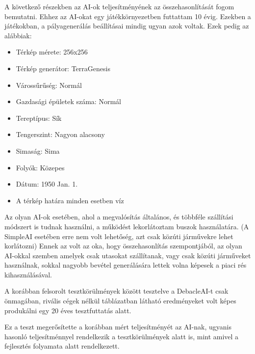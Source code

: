 
A következő részekben az AI-ok teljesítményének az összehasonlítását fogom bemutatni. Ehhez az AI-okat egy játékkörnyezetben futtattam 10 évig. Ezekben a játékokban, a pályagenerálás beállításai mindig ugyan azok voltak. Ezek pedig az alábbiak:

\begin{itemize}
	\item Térkép mérete: 256x256
	\item Térkép generátor: TerraGenesis
	\item Várossűrűség: Normál
	\item Gazdasági épületek száma: Normál
	\item Tereptípus: Sík
	\item Tengerszint: Nagyon alacsony
	\item Simaság: Sima
	\item Folyók: Közepes
	\item Dátum: 1950 Jan. 1.
	\item A térkép határa minden esetben víz
\end{itemize}

Az olyan AI-ok esetében, ahol a megvalósítás általános, és többféle szállítási módszert is tudnak használni, a működést lekorlátoztam buszok használatára. (A SimpleAI esetében erre nem volt lehetőség, azt csak közúti járművekre lehet korlátozni) Ennek az volt az oka, hogy összehasonlítás szempontjából, az olyan AI-okkal szemben amelyek csak utasokat szállítanak, vagy csak közúti járműveket használnak, sokkal nagyobb bevétel generálására lettek volna képesek a piaci rés kihasználásával.


A korábban felsorolt tesztkörülmények között tesztelve a DebacleAI-t csak önmagában, rivális cégek nélkül  táblázatban látható eredményeket volt képes produkálni egy 20 éves tesztfuttatás alatt.

Ez a teszt megerősítette a korábban mért teljesítményét az AI-nak, ugyanis hasonló teljesítménnyel rendelkezik a tesztkörülmények alatt is, mint amivel a fejlesztés folyamata alatt rendelkezett.

